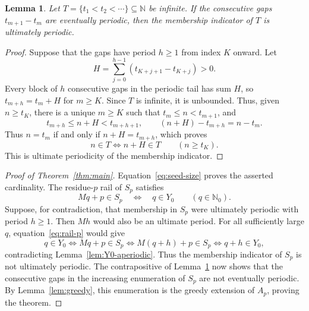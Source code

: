 \documentclass[11pt,letterpaper]{article}
\newtheorem{lemma}[theorem]{Lemma}
\newcommand{\N}{\mathbb{N}}
\newcommand{\Nzero}{\mathbb{N}_0}
\begin{document}
\begin{lemma}\label{lem:gaps-imply-membership}
Let \(T=\{t_1<t_2<\cdots\}\subseteq\N\) be infinite. If the consecutive gaps \(t_{m+1}-t_m\) are eventually periodic, then the membership indicator of \(T\) is ultimately periodic.
\end{lemma}

\begin{proof}
Suppose that the gaps have period \(h\geq1\) from index \(K\) onward. Let
\[
H=\sum_{j=0}^{h-1}(t_{K+j+1}-t_{K+j})>0.
\]
Every block of \(h\) consecutive gaps in the periodic tail has sum \(H\), so \(t_{m+h}=t_m+H\) for \(m\geq K\). Since \(T\) is infinite, it is unbounded. Thus, given \(n\geq t_K\), there is a unique \(m\geq K\) such that \(t_m\leq n<t_{m+1}\), and
\[
t_{m+h}\leq n+H<t_{m+h+1},
\qquad
(n+H)-t_{m+h}=n-t_m.
\]
Thus \(n=t_m\) if and only if \(n+H=t_{m+h}\), which proves
\[
n\in T\iff n+H\in T
\qquad(n\geq t_K).
\]
This is ultimate periodicity of the membership indicator.
\end{proof}

\begin{proof}[Proof of Theorem~\ref{thm:main}]
Equation~\eqref{eq:seed-size} proves the asserted cardinality. The residue-\(p\) rail of \(S_p\) satisfies
\begin{equation}\label{eq:rail-p}
Mq+p\in S_p\quad\Longleftrightarrow\quad q\in Y_0
\qquad(q\in\Nzero).
\end{equation}
Suppose, for contradiction, that membership in \(S_p\) were ultimately periodic with period \(h\geq1\). Then \(Mh\) would also be an ultimate period. For all sufficiently large \(q\), equation~\eqref{eq:rail-p} would give
\[
q\in Y_0
\iff Mq+p\in S_p
\iff M(q+h)+p\in S_p
\iff q+h\in Y_0,
\]
contradicting Lemma~\ref{lem:Y0-aperiodic}. Thus the membership indicator of \(S_p\) is not ultimately periodic. The contrapositive of Lemma~\ref{lem:gaps-imply-membership} now shows that the consecutive gaps in the increasing enumeration of \(S_p\) are not eventually periodic. By Lemma~\ref{lem:greedy}, this enumeration is the greedy extension of \(A_p\), proving the theorem.
\end{proof}
\end{document}
